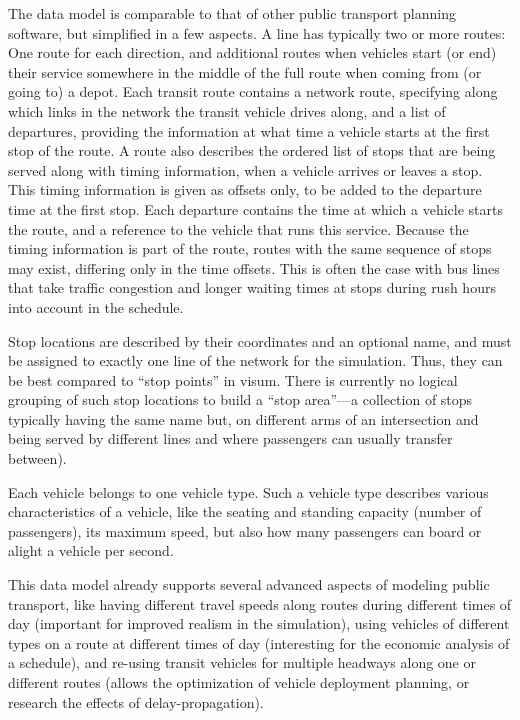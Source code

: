 The data model is comparable to that of other public transport planning
software, but simplified in a few aspects. A line has typically two or more
routes: One route for each direction, and additional routes when vehicles start
(or end) their service somewhere in the middle of the full route when coming
from (or going to) a depot. Each transit route contains a network route,
specifying along which links in the network the transit vehicle drives along,
and a list of departures, providing the information at what time a vehicle
starts at the first stop of the route. A route also describes the ordered list
of stops that are being served along with timing information, when a vehicle
arrives or leaves a stop. This timing information is given as offsets only, to
be added to the departure time at the first stop. Each departure contains the
time at which a vehicle starts the route, and a reference to the vehicle that
runs this service. Because the timing information is part of the route, routes
with the same sequence of stops may exist, differing only in the time offsets.
This is often the case with bus lines that take traffic congestion and
longer waiting times at stops during rush hours into account in the schedule. 

Stop locations are described by their coordinates and an optional name, and must
be assigned to exactly one line of the network for the simulation. Thus, they
can be best compared to ``stop points'' in \gls{visum}. There is currently no logical
grouping of such stop locations to build a ``stop area''---a collection of
stops typically having the same name but, \eg on different arms of an intersection and
being served by different lines and where passengers can usually transfer
between).

Each vehicle belongs to one vehicle type. Such a vehicle type describes various
characteristics of a vehicle, like the seating and standing capacity (number of
passengers), its maximum speed, but also how many passengers can board or alight
a vehicle per second.

This data model already supports several advanced aspects of modeling public
transport, like having different travel speeds along routes during different
times of day (important for improved realism in the simulation), using vehicles
of different types on a route at different times of day (interesting for the
economic analysis of a schedule), and re-using transit vehicles for multiple
headways along one or different routes (allows the optimization of vehicle
deployment planning, or research the effects of delay-propagation).

